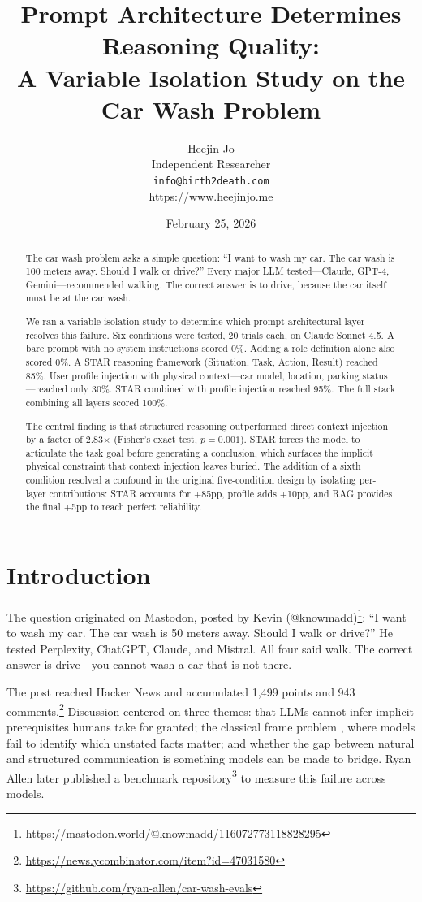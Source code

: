 \documentclass[11pt]{article}
\title{Prompt Architecture Determines Reasoning Quality:\\A Variable Isolation Study on the Car Wash Problem}
\author{Heejin Jo\\
  Independent Researcher\\
  \texttt{info@birth2death.com}\\
  \url{https://www.heejinjo.me}
}
\date{February 25, 2026}
\begin{document}
\maketitle

\begin{abstract}
The car wash problem asks a simple question: ``I want to wash my car. The car wash is 100 meters away. Should I walk or drive?'' Every major LLM tested---Claude, GPT-4, Gemini---recommended walking. The correct answer is to drive, because the car itself must be at the car wash.

We ran a variable isolation study to determine which prompt architectural layer resolves this failure. Six conditions were tested, 20 trials each, on Claude Sonnet 4.5. A bare prompt with no system instructions scored 0\%. Adding a role definition alone also scored 0\%. A STAR reasoning framework (Situation, Task, Action, Result) reached 85\%. User profile injection with physical context---car model, location, parking status---reached only 30\%. STAR combined with profile injection reached 95\%. The full stack combining all layers scored 100\%.

The central finding is that structured reasoning outperformed direct context injection by a factor of 2.83$\times$ (Fisher's exact test, $p = 0.001$). STAR forces the model to articulate the task goal before generating a conclusion, which surfaces the implicit physical constraint that context injection leaves buried. The addition of a sixth condition resolved a confound in the original five-condition design by isolating per-layer contributions: STAR accounts for +85pp, profile adds +10pp, and RAG provides the final +5pp to reach perfect reliability.
\end{abstract}

\section{Introduction}

The question originated on Mastodon, posted by Kevin (@knowmadd)\footnote{\url{https://mastodon.world/@knowmadd/116072773118828295}}: ``I want to wash my car. The car wash is 50 meters away. Should I walk or drive?'' He tested Perplexity, ChatGPT, Claude, and Mistral. All four said walk. The correct answer is drive---you cannot wash a car that is not there.

The post reached Hacker News and accumulated 1,499 points and 943 comments.\footnote{\url{https://news.ycombinator.com/item?id=47031580}} Discussion centered on three themes: that LLMs cannot infer implicit prerequisites humans take for granted; the classical frame problem \citep{mccarthy1969}, where models fail to identify which unstated facts matter; and whether the gap between natural and structured communication is something models can be made to bridge. Ryan Allen later published a benchmark repository\footnote{\url{https://github.com/ryan-allen/car-wash-evals}} to measure this failure across models.
\end{document}

